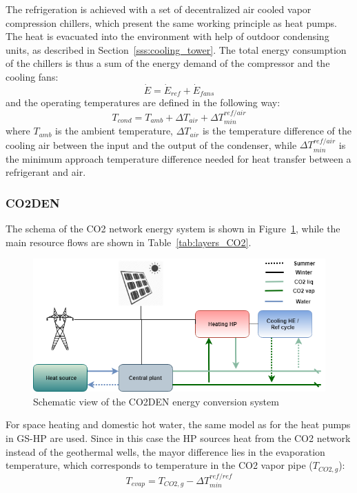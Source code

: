 \documentclass{article}
\begin{document}
The refrigeration is achieved with a set of decentralized air cooled vapor compression chillers, which present the same working principle as heat pumps. The heat is evacuated into the environment with help of outdoor condensing units, as described in Section~\ref{sss:cooling_tower}.
The total energy consumption of the chillers is thus a sum of the energy demand of the compressor and the cooling fans:
\begin{equation}
\dot{E} = \dot{E}_{ref} + \dot{E}_{fans}
\end{equation}
and the operating temperatures are defined in the following way:
\begin{equation}
    T_{cond} = T_{amb} + \Delta T_{air} + \Delta T_{min}^{ref/air}
\end{equation}
where $T_{amb}$ is the ambient temperature, $\Delta T_{air}$ is the temperature difference of the cooling air between the input and the output of the condenser, while $\Delta T_{min}^{ref/air}$ is the minimum approach temperature difference needed for heat transfer between a refrigerant and air.\\

\subsubsection{CO2DEN}\label{sss:CO2DEN}
The schema of the CO2 network energy system is shown in Figure~\ref{fig:energyschema}, while the main resource flows are shown in Table~\ref{tab:layers_CO2}.

\begin{figure}[tph]
	\centering
	\includegraphics[width=1\linewidth]{Images/energy_schema}
	\caption{Schematic view of the CO2DEN energy conversion system}
	\label{fig:energyschema}
\end{figure}



For space heating and domestic hot water, the same model as for the heat pumps in GS-HP are used. Since in this case the HP sources heat from the CO2 network instead of the geothermal wells, the mayor difference lies in the evaporation temperature, which corresponds to temperature in the CO2 vapor pipe ($T_{CO2,g}$):
\begin{equation}
    T_{evap} = T_{CO2,g} - \Delta T_{min}^{ref/ref}
\end{equation}
\end{document}
